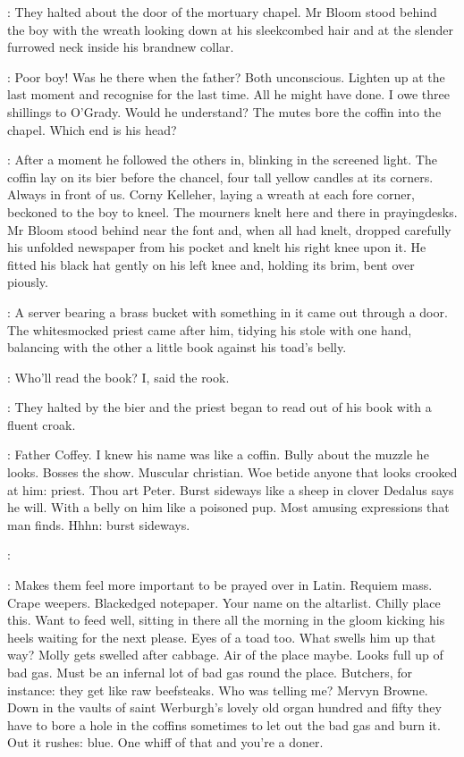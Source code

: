 :
They halted about the door of the mortuary chapel.
Mr Bloom stood behind the boy with the wreath
looking down at his sleekcombed hair and
at the slender furrowed neck inside his brandnew collar.

\BloomInt:
Poor boy!
Was he there when the father?
Both unconscious.
Lighten up at the last moment and recognise for the last time.
All he might have done.
I owe three shillings to O'Grady.
Would he understand?
The mutes bore the coffin into the chapel.
Which end is his head?

:
After a moment he followed the others in,
blinking in the screened light.
The coffin lay on its bier before the chancel,
four tall yellow candles at its corners.
Always in front of us.
Corny Kelleher, laying a wreath at each fore corner,
beckoned to the boy to kneel.
The mourners knelt here and there in prayingdesks.
Mr Bloom stood behind near the font
and, when all had knelt,
dropped carefully his unfolded newspaper from his pocket
and knelt his right knee upon it.
He fitted his black hat gently on his left knee
and, holding its brim, bent over piously.

:
A server bearing a brass bucket with something in it came out through a door.
The whitesmocked priest came after him,
tidying his stole with one hand,
balancing with the other a little book against his toad's belly.

\BloomInt:
Who'll read the book?
I, said the rook.

:
They halted by the bier
and the priest began to read out of his book
with a fluent croak.

\BloomInt:
Father Coffey.
I knew his name was like a coffin.
Bully about the muzzle he looks.
Bosses the show.
Muscular christian.
Woe betide anyone that looks crooked at him:
priest.
Thou art Peter.
Burst sideways like a sheep in clover
Dedalus says he will.
With a belly on him like a poisoned pup.
Most amusing expressions that man finds.
Hhhn:
burst sideways.

\coffey:

\BloomInt:
Makes them feel more important to be prayed over in Latin.
Requiem mass.
Crape weepers.
Blackedged notepaper.
Your name on the altarlist.
Chilly place this.
Want to feed well, sitting in there all the morning
in the gloom kicking his heels
waiting for the next please.
Eyes of a toad too.
What swells him up that way?
Molly gets swelled after cabbage.
Air of the place maybe.
Looks full up of bad gas.
Must be an infernal lot of bad gas round the place.
Butchers, for instance:
they get like raw beefsteaks.
Who was telling me?
Mervyn Browne.
Down in the vaults of saint Werburgh's
lovely old organ hundred and fifty
they have to bore a hole in the coffins
sometimes to let out the bad gas and burn it.
Out it rushes:
blue.
One whiff of that and you're a doner.

